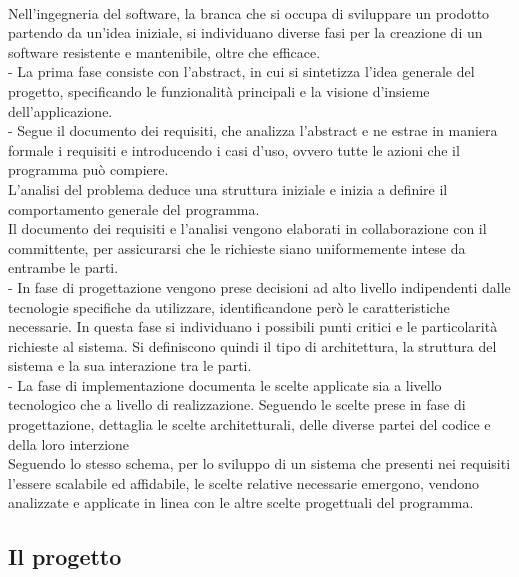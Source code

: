 \\
Nell'ingegneria del software, la branca che si occupa di sviluppare un prodotto partendo da un'idea iniziale, 
si individuano diverse fasi per la creazione di un software resistente e mantenibile, oltre che efficace.\\
    - La prima fase consiste con l'abstract, in cui si sintetizza l'idea generale del progetto, 
    specificando le funzionalità principali e la visione d'insieme dell'applicazione.\\
    - Segue il documento dei requisiti, che analizza l'abstract e ne estrae in maniera formale i requisiti e introducendo i casi d'uso, 
    ovvero tutte le azioni che il programma può compiere.\\
    L'analisi del problema deduce una struttura iniziale e inizia a definire il comportamento generale del programma.\\
    Il documento dei requisiti e l'analisi vengono elaborati in collaborazione con il committente, 
    per assicurarsi che le richieste siano uniformemente intese da entrambe le parti.\\
    - In fase di progettazione vengono prese decisioni ad alto livello indipendenti dalle tecnologie specifiche da utilizzare, 
    identificandone però le caratteristiche necessarie. 
    In questa fase si individuano i possibili punti critici e le particolarità richieste al sistema.
    Si definiscono quindi il tipo di architettura, la struttura del sistema e la sua interazione tra le parti.\\
    - La fase di implementazione documenta le scelte applicate sia a livello tecnologico che a livello di realizzazione. 
    Seguendo le scelte prese in fase di progettazione, dettaglia le scelte architetturali, delle diverse partei del codice e della loro interzione \\
Seguendo lo stesso schema, per lo sviluppo di un sistema che presenti nei requisiti l'essere scalabile ed affidabile, 
le scelte relative necessarie emergono, vendono analizzate e applicate in linea con le altre scelte progettuali del programma.\\
\clearpage











\subsection{Il progetto}

